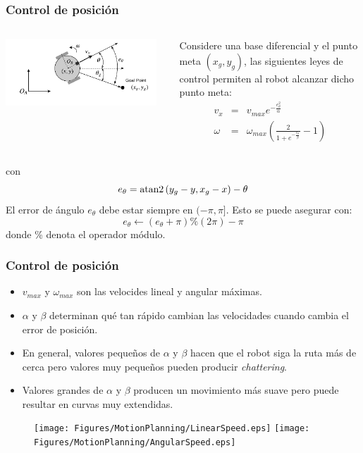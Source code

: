 \begin{frame}\frametitle{Control de posición}
  \begin{columns}
    \begin{column}{0.5\textwidth}
      \includegraphics[width=0.95\textwidth]{Figures/MotionPlanning/GoalPose.pdf}
    \end{column}
    \begin{column}{0.5\textwidth}
      Considere una base diferencial y el punto meta $(x_g, y_g)$, las siguientes leyes de control permiten al robot alcanzar dicho punto meta:
      \begin{eqnarray*}
        v_x    &=& v_{max}e^{-\frac{e_{\theta}^{2}}{\alpha}}\label{eq:Control11}\\
        \omega &=& \omega_{max}\left(\frac{2}{1+e^{-\frac{e_{\theta}}{\beta}}}-1\right)\label{eq:Control12}
      \end{eqnarray*}
    \end{column}
  \end{columns}
  con
  \[e_{\theta} = \operatorname{atan2}\left(y_g - y, x_g - x\right) - \theta\]
  El error de ángulo $e_\theta$ debe estar siempre en $(-\pi, \pi]$. Esto se puede asegurar con:
  \[e_\theta \leftarrow \left(e_\theta + \pi\right)\% (2\pi) - \pi\]
  donde \% denota el operador módulo. 
\end{frame}

\begin{frame}\frametitle{Control de posición}
  \begin{itemize}
  \item $v_{max}$ y $\omega_{max}$ son las velocides lineal y angular máximas.
  \item $\alpha$ y $\beta$ determinan qué tan rápido cambian las velocidades cuando cambia el error de posición.
  \item En general, valores pequeños de $\alpha$ y $\beta$ hacen que el robot siga la ruta más de cerca pero valores muy pequeños pueden producir \textit{chattering}.
    \item Valores grandes de  $\alpha$ y $\beta$ producen un movimiento más suave pero puede resultar en curvas muy extendidas. 
  \end{itemize}
  \begin{figure}
    \centering
    \texttt{[image: Figures/MotionPlanning/LinearSpeed.eps]}
    \texttt{[image: Figures/MotionPlanning/AngularSpeed.eps]}
  \end{figure}
\end{frame}


